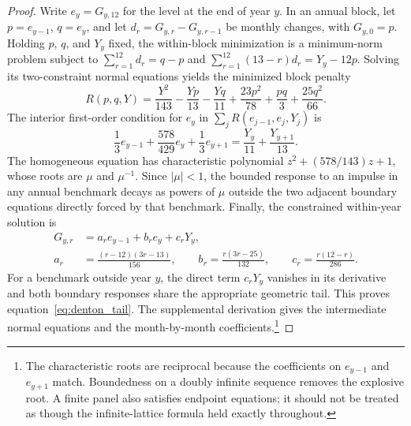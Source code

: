 \documentclass[preprint,12pt,authoryear]{elsarticle}
\begin{document}
\begin{proof}
Write $e_y=G_{y,12}$ for the level at the end of year $y$. In an annual block, let $p=e_{y-1}$, $q=e_y$, and let $d_r=G_{y,r}-G_{y,r-1}$ be monthly changes, with $G_{y,0}=p$. Holding $p$, $q$, and $Y_y$ fixed, the within-block minimization is a minimum-norm problem subject to $\sum_{r=1}^{12}d_r=q-p$ and $\sum_{r=1}^{12}(13-r)d_r=Y_y-12p$. Solving its two-constraint normal equations yields the minimized block penalty
\begin{equation}
R(p,q,Y)=\frac{Y^2}{143}-\frac{Yp}{13}-\frac{Yq}{11}
+\frac{23p^2}{78}+\frac{pq}{3}+\frac{25q^2}{66}.
\label{eq:block_penalty}
\end{equation}
The interior first-order condition for $e_y$ in $\sum_j R(e_{j-1},e_j,Y_j)$ is
\begin{equation}
\frac13e_{y-1}+\frac{578}{429}e_y+\frac13e_{y+1}
=\frac{Y_y}{11}+\frac{Y_{y+1}}{13}.
\label{eq:boundary_recurrence}
\end{equation}
The homogeneous equation has characteristic polynomial
$z^2+(578/143)z+1$, whose roots are $\mu$ and $\mu^{-1}$. Since $|\mu|<1$, the bounded response to an impulse in any annual benchmark decays as powers of $\mu$ outside the two adjacent boundary equations directly forced by that benchmark. Finally, the constrained within-year solution is
\begin{equation}
\begin{aligned}
G_{y,r}&=a_r e_{y-1}+b_r e_y+c_rY_y,\\
a_r&=\frac{(r-12)(3r-13)}{156},\qquad
b_r=\frac{r(3r-25)}{132},\qquad c_r=\frac{r(12-r)}{286}.
\end{aligned}
\label{eq:monthly_backsub}
\end{equation}
For a benchmark outside year $y$, the direct term $c_rY_y$ vanishes in its derivative and both boundary responses share the appropriate geometric tail. This proves equation~\eqref{eq:denton_tail}. The supplemental derivation gives the intermediate normal equations and the month-by-month coefficients.\footnote{The characteristic roots are reciprocal because the coefficients on $e_{y-1}$ and $e_{y+1}$ match. Boundedness on a doubly infinite sequence removes the explosive root. A finite panel also satisfies endpoint equations; it should not be treated as though the infinite-lattice formula held exactly throughout.}
\end{proof}


\end{document}
